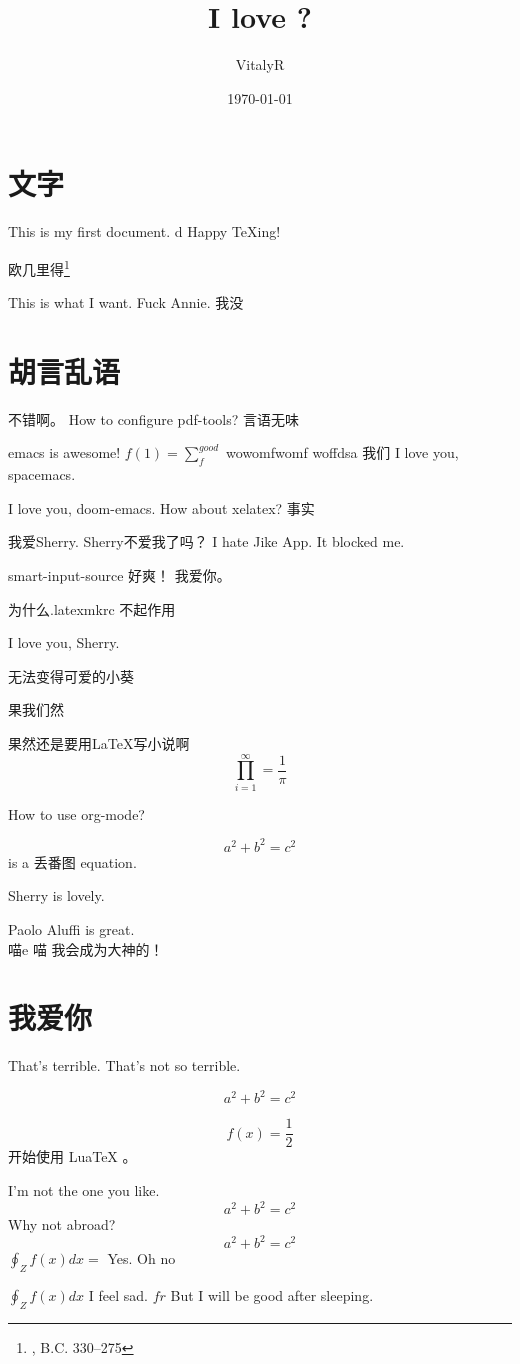 \documentclass[UTF8]{ctexart}
\title{I love ?}
\author{VitalyR}
\date{\today}
\begin{document}
\maketitle
\tableofcontents

\section{文字}
This is my first document.
d
Happy \TeX ing!

欧几里得\footnote{, B.C. 330--275}

This is what I want.
Fuck Annie.
我没

\section{胡言乱语}

不错啊。
How to configure pdf-tools?
言语无味

emacs is awesome!
\(f(1)=\sum_{f}^{good}\)
wowomfwomf woffdsa
我们
I love you, spacemacs.

I love you, doom-emacs.
How about xelatex?
事实

我爱Sherry.
Sherry不爱我了吗？
I hate Jike App. It blocked me.

smart-input-source 好爽！
我爱你。

为什么.latexmkrc 不起作用

I love you, Sherry.

无法变得可爱的小葵

果我们然

果然还是要用\LaTeX 写小说啊
\begin{equation}
	\prod_{i=1}^{\infty}=\frac{1}{\pi}
\end{equation}

How to use org-mode?

\[a^{2}+b^{2}=c^{2}\] is a 丢番图 equation.

Sherry is lovely.

Paolo Aluffi is great.\\
喵e
喵
我会成为大神的！

\section{我爱你}

That's terrible.
That's not so terrible.

\begin{equation}
	\label{eq:2}
	a^{2}+b^{2}=c^{2}
\end{equation}

\begin{equation}
  f(x)=\frac{1}{2}
\end{equation}
开始使用 LuaTeX 。

I'm not the one you like.
\[a^{2}+b^{2}=c^{2}\]
Why not abroad?
\[a^{2}+b^{2}=c^{2}\] \(\oint_{Z}f(x)dx = \) Yes.
Oh
no

\(\oint_{Z}f(x)dx\)
I feel sad.
\(fr\)
But I will be good after sleeping.
\end{document}
